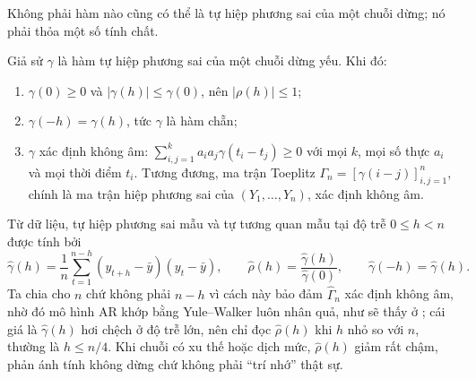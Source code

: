 
Không phải hàm nào cũng có thể là tự hiệp phương sai của một chuỗi dừng; nó phải thỏa một số tính chất.
\begin{kq}
Giả sử $\gamma$ là hàm tự hiệp phương sai của một chuỗi dừng yếu. Khi đó:
\begin{enumerate}[label=(\roman*),leftmargin=*,itemsep=1pt]
\item $\gamma(0)\ge0$ và $|\gamma(h)|\le\gamma(0)$, nên $|\rho(h)|\le1$;
\item $\gamma(-h)=\gamma(h)$, tức $\gamma$ là hàm chẵn;
\item $\gamma$ xác định không âm: $\sum_{i,j=1}^{k}a_ia_j\gamma(t_i-t_j)\ge0$ với mọi $k$, mọi số thực $a_i$ và mọi thời điểm $t_i$. Tương đương, ma trận Toeplitz $\Gamma_n=[\gamma(i-j)]_{i,j=1}^{n}$, chính là ma trận hiệp phương sai của $(Y_1,\dots,Y_n)$, xác định không âm.
\end{enumerate}
\end{kq}
Từ dữ liệu, tự hiệp phương sai mẫu và tự tương quan mẫu tại độ trễ $0\le h<n$ được tính bởi
\[
\hat\gamma(h)=\frac1n\sum_{t=1}^{n-h}(y_{t+h}-\bar y)(y_t-\bar y),\qquad \hat\rho(h)=\frac{\hat\gamma(h)}{\hat\gamma(0)},\qquad \hat\gamma(-h)=\hat\gamma(h).
\]
Ta chia cho $n$ chứ không phải $n-h$ vì cách này bảo đảm $\hat\Gamma_n$ xác định không âm, nhờ đó mô hình AR khớp bằng Yule--Walker luôn nhân quả, như sẽ thấy ở ; cái giá là $\hat\gamma(h)$ hơi chệch ở độ trễ lớn, nên chỉ đọc $\hat\rho(h)$ khi $h$ nhỏ so với $n$, thường là $h\le n/4$. Khi chuỗi có xu thế hoặc dịch mức, $\hat\rho(h)$ giảm rất chậm, phản ánh tính không dừng chứ không phải ``trí nhớ'' thật sự.

